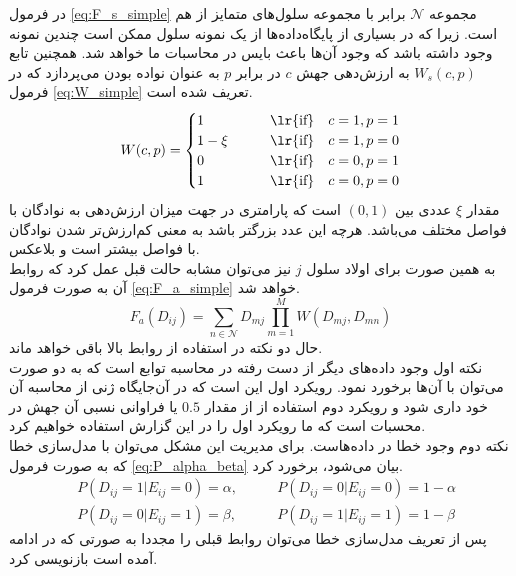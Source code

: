 در فرمول \ref{eq:F_s_simple} مجموعه $\mathcal{N}$ برابر با مجموعه سلول‌های متمایز از هم است. زیرا که در بسیاری از پایگاه‌داده‌ها از یک نمونه سلول ممکن است چندین نمونه وجود داشته باشد که وجود آن‌ها باعث بایس در محاسبات ما خواهد شد. همچنین تابع $W_s(c,p)$ به ارزش‌دهی جهش $c$ در برابر $p$ به عنوان نواده بودن می‌پردازد که در فرمول \ref{eq:W_simple} تعریف شده است.
\begin{equation}
	W(c, p) = 
	\begin{cases}
		1 	       &\qquad \text{\lr{if}} \quad c=1, p=1 \\
		1-\xi   &\qquad \text{\lr{if}} \quad c=1, p=0 \\
		0 		  &\qquad \text{\lr{if}} \quad c=0, p=1 \\
		1 	 	  &\qquad \text{\lr{if}} \quad c=0, p=0
	\end{cases}
	\label{eq:W_simple}
\end{equation}
مقدار $\xi$ عددی بین $(0,1)$ است که پارامتری در جهت میزان ارزش‌دهی به نوادگان با فواصل مختلف می‌باشد. هرچه این عدد بزرگتر باشد به معنی کم‌ارزش‌تر شدن نوادگان با فواصل بیشتر است و بلاعکس.
\\
به همین صورت برای اولاد سلول $j$ نیز می‌توان مشابه حالت قبل عمل کرد که روابط آن به صورت فرمول‌ \ref{eq:F_a_simple} خواهد شد.
\begin{equation}
	F_a(D_{ij}) = \sum_{n \in \mathcal{N}}  D_{mj}  \prod_{m=1}^{M} W(D_{mj}, D_{mn})
	\label{eq:F_a_simple}
\end{equation}
حال دو نکته در استفاده از روابط بالا باقی خواهد ماند. 
\\
نکته اول وجود داده‌های دیگر از دست رفته در محاسبه توابع است که به دو صورت می‌توان با آن‌ها برخورد  نمود. رویکرد اول این است که در آن‌جایگاه ژنی از محاسبه آن خود داری شود و رویکرد دوم استفاده از از مقدار $0.5$ یا فراوانی نسبی آن جهش در محسبات است که ما رویکرد اول را در این گزارش استفاده خواهیم کرد.
\\
نکته دوم وجود خطا در داده‌هاست. برای مدیریت این مشکل می‌توان با مدل‌سازی خطا که به صورت فرمول \ref{eq:P_alpha_beta} بیان می‌شود، برخورد کرد.
\begin{equation}
	\begin{aligned}
		&P(D_{ij}=1|E_{ij}=0)=\alpha, &\qquad P(D_{ij}=0|E_{ij}=0)=1-\alpha \\ &P(D_{ij}=0|E_{ij}=1)=\beta, &\qquad P(D_{ij}=1|E_{ij}=1)=1-\beta
	\end{aligned}
	\label{eq:P_alpha_beta}
\end{equation}
پس از تعریف مدل‌سازی خطا می‌توان روابط قبلی را مجددا به صورتی که در ادامه آمده است بازنویسی کرد.
